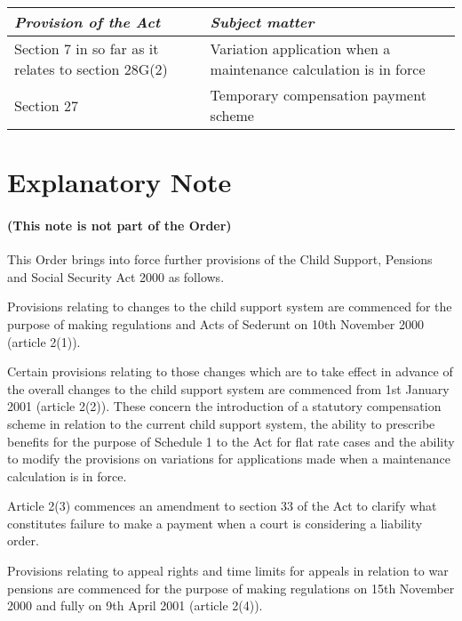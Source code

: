 \documentclass[12pt,a4paper]{article}
\begin{document}
\renewcommand\parthead{--- Schedule Part I}

{\footnotesize\noindent
\begin{tabulary}{\linewidth}{JJ}
\hline
\itshape Provision of the Act	& \itshape Subject matter\\
\hline
Section 7 in so far as it relates to section 28G(2)	&Variation application when a maintenance calculation is in force\\
Section 27	&Temporary compensation payment scheme\\
\hline
\end{tabulary}

}

\part{Explanatory Note}

\renewcommand\parthead{--- Explanatory Note}

\subsection*{(This note is not part of the Order)}

This Order brings into force further provisions of the Child Support, Pensions and Social Security Act 2000 as follows.

Provisions relating to changes to the child support system are commenced for the purpose of making regulations and Acts of Sederunt on 10th November 2000 (article 2(1)).

Certain provisions relating to those changes which are to take effect in advance of the overall changes to the child support system are commenced from 1st January 2001 (article 2(2)). These concern the introduction of a statutory compensation scheme in relation to the current child support system, the ability to prescribe benefits for the purpose of Schedule 1 to the Act for flat rate cases and the ability to modify the provisions on variations for applications made when a maintenance calculation is in force.

Article 2(3) commences an amendment to section 33 of the Act to clarify what constitutes failure to make a payment when a court is considering a liability order.

Provisions relating to appeal rights and time limits for appeals in relation to war pensions are commenced for the purpose of making regulations on 15th November 2000 and fully on 9th April 2001 (article 2(4)).
\end{document}
